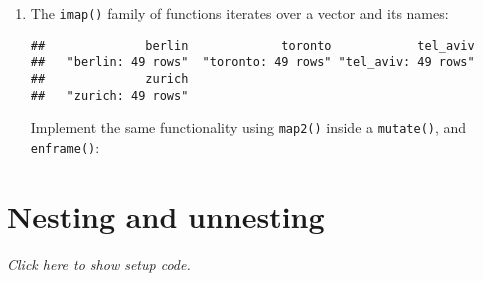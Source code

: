 \documentclass[]{book}
\newenvironment{Shaded}{\begin{snugshade}}{\end{snugshade}}
\newcommand{\DataTypeTok}[1]{\textcolor[rgb]{0.13,0.29,0.53}{#1}}
\newcommand{\KeywordTok}[1]{\textcolor[rgb]{0.13,0.29,0.53}{\textbf{#1}}}
\newcommand{\NormalTok}[1]{#1}
\newcommand{\OperatorTok}[1]{\textcolor[rgb]{0.81,0.36,0.00}{\textbf{#1}}}
\newcommand{\StringTok}[1]{\textcolor[rgb]{0.31,0.60,0.02}{#1}}
\begin{document}
\begin{enumerate}
\def\labelenumi{\arabic{enumi}.}
\item
  The \texttt{imap()} family of functions iterates over a vector and its names:

\begin{Shaded}
\end{Shaded}

\begin{verbatim}
##              berlin             toronto            tel_aviv 
##   "berlin: 49 rows"  "toronto: 49 rows" "tel_aviv: 49 rows" 
##              zurich 
##   "zurich: 49 rows"
\end{verbatim}

  Implement the same functionality using \texttt{map2()} inside a \texttt{mutate()}, and \texttt{enframe()}:

\begin{Shaded}
\end{Shaded}
\end{enumerate}

\hypertarget{nest}{%
\section{Nesting and unnesting}\label{nest}}

\emph{Click here to show setup code.}

\begin{Shaded}
\end{Shaded}
\end{document}
